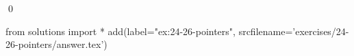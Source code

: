 
\begin{ex}
  \label{ex:24-26-pointers}
  
  \qed
\end{ex}
\begin{python0}
from solutions import *
add(label="ex:24-26-pointers",
    srcfilename='exercises/24-26-pointers/answer.tex')
\end{python0}
